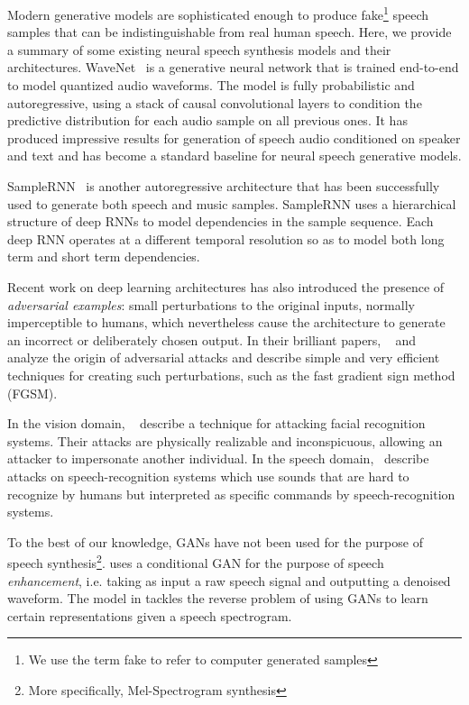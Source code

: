 Modern generative models are sophisticated enough to produce fake\footnote{We use the term fake to refer to
computer generated samples} speech samples that can be indistinguishable from real human speech. Here, we provide a summary of some existing neural speech synthesis models and their architectures.
WaveNet~\cite{van2016wavenet} is a generative neural network that is trained end-to-end
to model quantized audio waveforms. The model is fully
probabilistic and autoregressive, using a stack of causal convolutional layers
to condition the predictive distribution for each audio sample on all previous ones. It has produced impressive results for generation of speech audio conditioned on speaker and text and has become a standard baseline for neural speech generative models. 

SampleRNN~\cite{mehri2016samplernn} is another autoregressive architecture that
has been successfully used to generate both speech and music samples. SampleRNN
uses a hierarchical structure of deep RNNs to model dependencies in the sample
sequence. Each deep RNN operates at a different temporal resolution so as to
model both long term and short term dependencies. 


Recent work on deep learning architectures has also introduced the presence of \textit{adversarial examples}: small perturbations to the original inputs, normally imperceptible to humans, which nevertheless cause the architecture to generate an incorrect or deliberately chosen output. In their brilliant papers, ~\cite{szegedy2013intriguing} and
~\cite{goodfellow2014explaining} analyze the origin of adversarial attacks and
describe simple and very efficient techniques for creating such perturbations, such as the fast gradient sign method (FGSM). 

In the vision domain, ~\cite{sharif2016accessorize} describe a technique for attacking facial recognition systems. Their attacks are physically realizable and inconspicuous, allowing an attacker to impersonate another individual. In the speech domain,~\cite{carlini2016hidden} describe attacks on speech-recognition systems which use sounds that are hard to recognize by humans but interpreted as specific commands by speech-recognition systems.

To the best of our knowledge, GANs have not been used for the purpose of speech synthesis\footnote{More specifically, Mel-Spectrogram synthesis}. \cite{pascual2017segan} uses a conditional GAN for the purpose of speech \textit{enhancement}, i.e. taking as input a raw speech signal and outputting a denoised waveform. The model in \cite{chang2017learning} tackles the reverse problem of using GANs to learn certain representations given a speech spectrogram. %